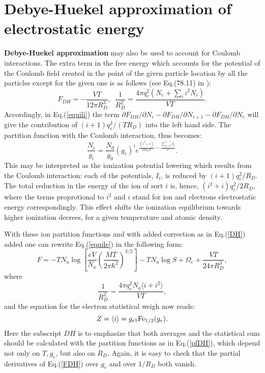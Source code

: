 \section{Debye-Huekel approximation of electrostatic energy}
{\bf Debye-Huekel approximation} may also be used to account for Coulomb interactions.
The extra term in the free energy which accounts for the
potential of the Coulomb field created in the point of the given particle location
by all the particles except for the given one is as follows (see Eq.(78.11) in \cite{ll}):
\begin{equation}\label{DH}
F_{DH}=-\frac{VT}{12\pi R_D^3},\,\,\,\frac1{R_D^2} = \frac{4\pi q_e^2(N_e+\sum_i{i^2N_i})}{VT}.
\end{equation}
Accordingly, in Eq.(\ref{equili}) the term $\partial F_{DH}/\partial N_i -\partial F_{DH}/\partial N_{i+1}-\partial F_{DH}/\partial N_e$ will 
give the contribution of $(i+1)q^2_e/(TR_D)$ into the left hand side. The partition function with the Coulomb interaction, thus becomes:
\begin{equation}\label{pfDH}
\frac{N_{i}}{g_{i}}=\frac{N_0}{g_0}(g_e)^ie^{\frac{(i^2+i)}{2R_DT}-\frac{\sum_{j=0}^{i-1}I_j}T}.
\end{equation}
This may be interpreted as the ionization potential lowering which results from the Coulomb interaction: each of the potentials, $I_i$, is reduced
by $(i+1)q_e^2/R_D$. The total reduction in the energy of the ion of sort $i$ is, hence, $(i^2+i)q_e^2/2R_D$, where the terms proprotional to $i^2$ and $i$ 
stand for ion and electrons electrostatic energy correspondingly. This effect shifts the ionization equilibrium towards higher ionization decrees, for a given 
temperature and atomic density. 

With these ion partition functions and with added correction as in Eq.(\ref{DH}) added
one can rewrite Eq.(\ref{equile}) in the following form:
\begin{equation}\label{FDH}
F = -TN_a\log\left[\frac{eV}{N_a}\left(\frac{MT}{2\pi \hbar^2}\right)^{3/2}\right]-TN_a\log S +\Omega_e +\frac{VT}{24\pi R_D^3}, 
\end{equation}
where
\begin{equation}\label{RDdef}
\frac1{R_D^2} = \frac{4\pi q_e^2N_a\langle i+i^2\rangle}{VT},
\end{equation}
and the equation for the electron statistical weigh now reads:
\begin{equation}
Z=\langle i\rangle=g_{e1}{\rm Fe}_{1/2}(g_e).
\end{equation}
Here the subscript $DH$ is to emphasize that both averages and the statistical sum
should be calculated with the partition functions as in
Eq.(\ref{pfDH}), which depend not only on $T,g_e$, but also on $R_D$.
Again, it is easy to check that the partial derivatives of
Eq.(\ref{FDH}) over $g_e$ and over $1/R_D$ both vanish.

